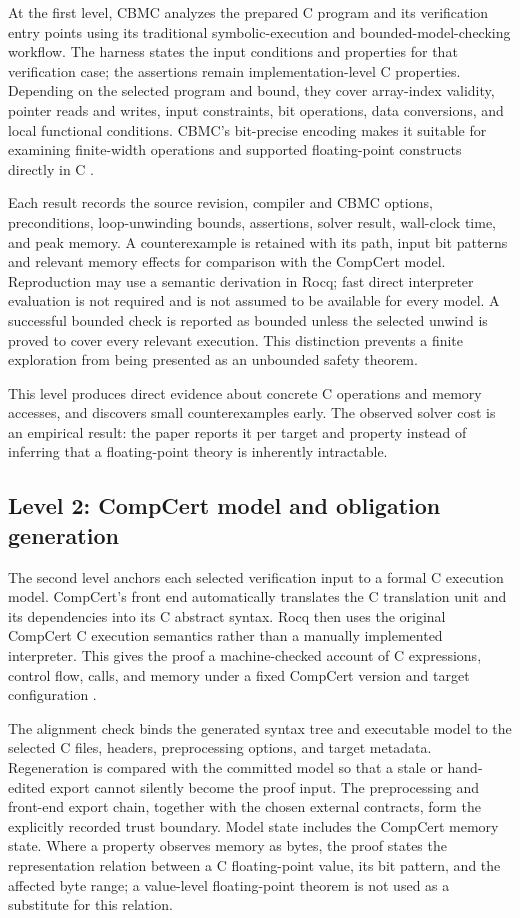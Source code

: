 \documentclass[manuscript, screen, review]{acmart}
\begin{document}
At the first level, CBMC analyzes the prepared C program and its
verification entry points using its traditional symbolic-execution and
bounded-model-checking workflow. The harness states the input conditions
and properties for that verification case; the assertions remain
implementation-level C properties. Depending on the selected program and bound, they cover
array-index validity, pointer reads and writes, input constraints, bit
operations, data conversions, and local functional conditions. CBMC's
bit-precise encoding makes it suitable for examining finite-width
operations and supported floating-point constructs directly in C
\cite{KroeningTautschnig2014}.

Each result records the source revision, compiler and CBMC options,
preconditions, loop-unwinding bounds, assertions, solver result, wall-clock
time, and peak memory. A counterexample is retained with its path, input bit patterns and relevant
memory effects for comparison with the CompCert model. Reproduction may
use a semantic derivation in Rocq; fast direct interpreter evaluation is
not required and is not assumed to be available for every model. A successful bounded check is reported as
bounded unless the selected unwind is proved to cover every relevant
execution. This distinction prevents a finite exploration from being
presented as an unbounded safety theorem.

This level produces direct evidence about concrete C operations and
memory accesses, and discovers small counterexamples early. The observed
solver cost is an empirical result: the paper reports it per target and
property instead of inferring that a floating-point theory is inherently
intractable.

\subsection{Level 2: CompCert model and obligation generation}

The second level anchors each selected verification input to a formal C
execution model. CompCert's front end automatically translates the C
translation unit and its dependencies into its C abstract syntax. Rocq then
uses the original CompCert C execution semantics rather than a manually
implemented interpreter. This gives the proof a machine-checked account of
C expressions, control flow, calls, and memory under a fixed CompCert
version and target configuration \cite{Leroy2009,Ramananandro2016}.

The alignment check binds the generated syntax tree and executable model
to the selected C files, headers, preprocessing options, and target
metadata. Regeneration is compared with the committed model so that a
stale or hand-edited export cannot silently become the proof input. The preprocessing and front-end export chain, together with the chosen
external contracts, form the explicitly recorded trust boundary. Model
state includes the CompCert memory state. Where a property observes memory
as bytes, the proof states the representation relation between a C
floating-point value, its bit pattern, and the affected byte range; a
value-level floating-point theorem is not used as a substitute for this
relation.
\end{document}
